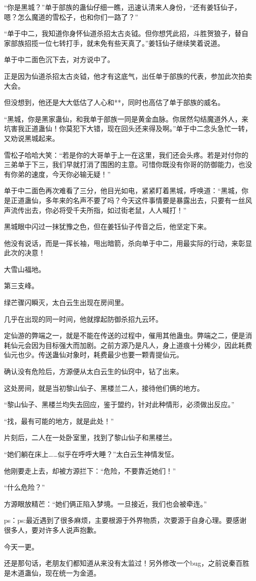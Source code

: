 \begin{this_body}
“你是黑城？”单于部族的蛊仙仔细一瞧，迅速认清来人身份，“还有姜钰仙子，嗯？怎么魔道的雪松子，也和你们一路了？”

“单于中二，我知道你身怀仙道杀招太古炎钺。但你想凭此招，斗胜贺狼子，替自家部族招揽一位七转打手，就未免有些天真了。”姜钰仙子继续笑着说道。

单于中二面色沉下去，对方说中了。

正是因为仙道杀招太古炎钺，他才有这底气，出任单于部族的代表，参加此次拍卖大会。

但没想到，他还是大大低估了人心和**，同时也高估了单于部族的威名。

“黑城，你是黑家蛊仙，和我单于部族一同是黄金血脉。你居然勾结魔道外人，来坑害我正道蛊仙！你莫犯下大错，现在回头还来得及啊。”单于中二念头急忙一转，又劝说黑城起来。

雪松子哈哈大笑：“若是你的大哥单于上一在这里，我们还会头疼。若是对付你的三弟单于下三，我们早就打消了围困的主意。可惜你既没有你哥的防御能力，也没有你弟的速度，今天你必输无疑！”

单于中二面色再次难看了三分，他目光如电，紧紧盯着黑城，呼唤道：“黑城，你是正道蛊仙，多年来的名声不要了吗？今天这件事情要是暴露出去，只要有一丝风声流传出去，你必将受千夫所指，如过街老鼠，人人喊打！”

黑城眼中闪过一抹犹豫之色，但在姜钰仙子传音之后，他坚定下来。

他没有说话，而是一挥长袖，甩出暗箭，杀向单于中二，用最实际的行动，来彰显此次的决意！

大雪山福地。

第三支峰。

绿芒骤闪瞬灭，太白云生出现在房间里。

几乎在出现的同一时间，他就撑起防御杀招九云环。

定仙游的弊端之一，就是不能在传送的过程中，催用其他蛊虫。弊端之二，便是消耗仙元会因为目标强大而加剧。之前方源乃是凡人，身上道痕十分稀少，因此耗费仙元也少。传送蛊仙对象时，耗费最少也要一颗青提仙元。

确认没有危险后，方源便从太白云生的仙窍中，钻了出来。

这处房间，就是当初黎山仙子、黑楼兰二人，接待他们俩的地方。

“黎山仙子、黑楼兰均失去回应，鉴于盟约，针对此种情形，必须做出反应。”

“找，最有可能的地方，就是此处！”

片刻后，二人在一处卧室里，找到了黎山仙子和黑楼兰。

“她们躺在床上……似乎在呼呼大睡？”太白云生神情发怔。

他刚要走上去，却被方源拦下：“危险，不要靠近她们！”

“什么危险？”

方源眼放精芒：“她们俩正陷入梦境。一旦接近，我们也会被牵连。”

ps：ps:最近遇到了很多麻烦，主要根源于外界物质，次要源于自身心理。要感谢很多人，要对许多人说声抱歉。

今天一更。

还是那句话，老朋友们都知道从来没有太监过！另外修改一个bug，之前说秦百胜是木道蛊仙，现在统一为金道。

\end{this_body}

